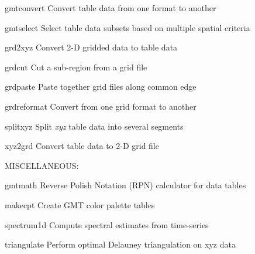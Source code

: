 \documentclass{article}
\begin{document}
\par 	gmtconvert	Convert table data from one format to another\par 

\par 	gmtselect	Select table data subsets based on multiple spatial criteria\par 

\par 	grd2xyz	Convert 2-D gridded data to table data\par 

\par 	grdcut	Cut a sub-region from a grid file\par 

\par 	grdpaste	Paste together grid files along common edge\par 

\par 	grdreformat	Convert from one grid format to another\par 

\par 	splitxyz	Split {\it xyz} table data into several segments\par 

\par 	xyz2grd	Convert table data to 2-D grid file\par 

\par \par 

\par MISCELLANEOUS:\par 

\par 	gmtmath	Reverse Polish Notation (RPN) calculator for data tables\par 

\par 	makecpt	Create GMT color palette tables\par 

\par 	spectrum1d	Compute spectral estimates from time-series\par 

\par 	triangulate	Perform optimal Delauney triangulation on xyz data\par 

\par \par 
\end{document}
